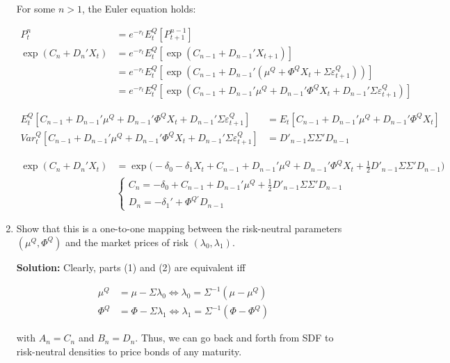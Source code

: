 \documentclass{article}
\begin{document}
\begin{enumerate}
For some $n>1$, the Euler equation holds:

\begin{align*}
P_t^n 
&= e^{-r_t} E_t^Q [P_{t+1}^{n-1}]\\
\exp(C_n + D_n'X_t)
&= e^{-r_t} E_t^Q [\exp(C_{n-1} + D_{n-1}'X_{t+1})]\\
&= e^{-r_t} E_t^Q [\exp(C_{n-1} + D_{n-1}'(\mu^Q + \Phi^Q X_t + \Sigma \varepsilon_{t+1}^Q))]\\
&= e^{-r_t} E_t^Q [\exp(C_{n-1} + D_{n-1}'\mu^Q + D_{n-1}'\Phi^Q X_t + D_{n-1}'\Sigma \varepsilon_{t+1}^Q)]
\end{align*}

\begin{align*}
E_t^Q[C_{n-1} + D_{n-1}'\mu^Q + D_{n-1}'\Phi^Q X_t + D_{n-1}'\Sigma \varepsilon_{t+1}^Q] 
&= E_t[C_{n-1} + D_{n-1}'\mu^Q + D_{n-1}'\Phi^Q X_t]\\
Var_t^Q [C_{n-1} + D_{n-1}'\mu^Q + D_{n-1}'\Phi^Q X_t + D_{n-1}'\Sigma \varepsilon_{t+1}^Q]
&= D'_{n-1} \Sigma \Sigma' D_{n-1}
\end{align*}

\begin{align*}
\exp(C_n + D_n'X_t)
&=  \exp \Bigg(-\delta_0 - \delta_1 X_t + C_{n-1} + D_{n-1}'\mu^Q + D_{n-1}'\Phi^Q X_t + \frac{1}{2} D'_{n-1} \Sigma \Sigma' D_{n-1} \Bigg)\\
& \begin{cases}
C_n = -\delta_0  + C_{n-1} + D_{n-1}'\mu^Q  + \frac{1}{2} D'_{n-1} \Sigma \Sigma' D_{n-1}\\
D_n = - \delta_1' + \Phi^{Q'} D_{n-1}
\end{cases}
\end{align*}

\item Show that this is a one-to-one mapping between the risk-neutral parameters $(\mu^Q,  \Phi^Q)$ and the market prices of risk $(\lambda_0, \lambda_1)$.

\bigskip

\textbf{Solution:} Clearly, parts (1) and (2) are equivalent iff

\begin{align*}
\mu^Q &= \mu - \Sigma \lambda_0  \iff \lambda_0 = \Sigma^{-1}(\mu - \mu^Q)\\
\Phi^Q &= \Phi - \Sigma \lambda_1 \iff \lambda_1 = \Sigma^{-1}(\Phi - \Phi^Q)
\end{align*}

with $A_n = C_n$ and $B_n = D_n$. Thus, we can go back and forth from SDF to risk-neutral densities to price bonds of any maturity.

\bigskip



\end{enumerate}
\end{document}
